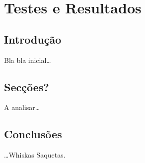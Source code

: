 \chapter{Testes e Resultados}
\label{ch::testes}

\section{Introdução}
\label{sec::testes:intro}

Bla bla inicial\ldots


\section{Secções?}
A analisar\ldots


\section{Conclusões}
\label{sec::testes:conc}

\ldots Whiskas Saquetas.
